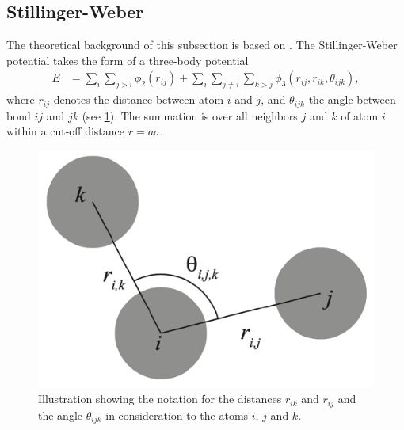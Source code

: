 \subsection{Stillinger-Weber}\label{sec:wb}
The theoretical background of this subsection is based on \cite{docs_lammps_sw, PhysRevB.31.5262}. The Stillinger-Weber potential takes the form of a three-body potential
\begin{align*}
  E &=\sum_i \sum_{j>i} \phi_2(r_{i j})+\sum_i \sum_{j \neq i} \sum_{k>j} \phi_3(r_{ij}, r_{ik}, \theta_{ijk}),
\end{align*}
where $r_{ij}$ denotes the distance between atom $i$ and $j$, and $\theta_{ijk}$
the angle between bond $ij$ and $jk$ (see \cref{fig:three_body_angle}). The summation is over all neighbors $j$
and $k$ of atom $i$ within a cut-off distance $r = a\sigma$. 

\begin{figure}[!htb]
  \centering
  \includegraphics[width=0.35\linewidth]{figures/theory/three_body_angle.pdf}
  \caption{Illustration showing the notation for the distances $r_{ik}$ and $r_{ij}$ and the angle $\theta_{ijk}$ in consideration to the atoms $i$, $j$ and $k$.}
  \label{fig:three_body_angle}
\end{figure}


